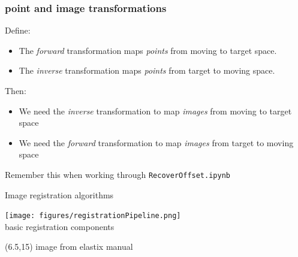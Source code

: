 \documentclass[aspectratio=169]{beamer}
\newcommand{\code}[1]{\texttt{#1}}
\newcommand\citefoot[1]{
    \begin{textblock}{12}(6.5,15)
        {\color{HHMIGrayB} \tiny #1}
    \end{textblock}
}
\begin{document}
\begin{frame}[plain]
\end{frame}


\begin{frame}[plain]%
\frametitle{point and image transformations}
    
    \vspace{2.0em}
    Define:
    \begin{itemize}
        \item The \emph{forward} transformation maps \emph{points} from
            \newline moving to target space.
        \item The \emph{inverse} transformation maps \emph{points} from
            \newline target to moving space.
    \end{itemize}

    Then:
    \begin{itemize}
        \item We need the \emph{inverse} transformation to map
            \emph{images} from \newline moving to target space
        \item We need the \emph{forward} transformation to map
            \emph{images} from \newline target to moving space
    \end{itemize}
    
    \vspace{0.8em}
    Remember this when working through \code{RecoverOffset.ipynb}

\end{frame}


\begin{frame}{Image registration algorithms}

    \vspace{0.8em}
    \begin{center}
        \texttt{[image: figures/registrationPipeline.png]} \\
        basic registration components
    \end{center}

    \citefoot{image from elastix manual}
\end{frame}
\end{document}
